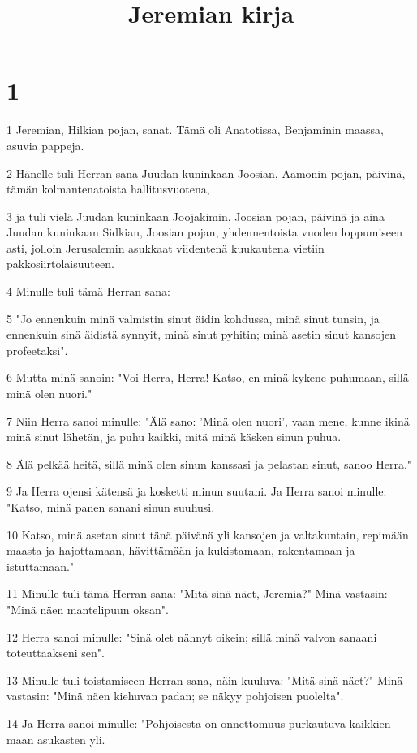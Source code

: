 

\title{Jeremian kirja}


\chapter{1}

\par 1 Jeremian, Hilkian pojan, sanat. Tämä oli Anatotissa, Benjaminin maassa, asuvia pappeja.
\par 2 Hänelle tuli Herran sana Juudan kuninkaan Joosian, Aamonin pojan, päivinä, tämän kolmantenatoista hallitusvuotena,
\par 3 ja tuli vielä Juudan kuninkaan Joojakimin, Joosian pojan, päivinä ja aina Juudan kuninkaan Sidkian, Joosian pojan, yhdennentoista vuoden loppumiseen asti, jolloin Jerusalemin asukkaat viidentenä kuukautena vietiin pakkosiirtolaisuuteen.
\par 4 Minulle tuli tämä Herran sana:
\par 5 "Jo ennenkuin minä valmistin sinut äidin kohdussa, minä sinut tunsin, ja ennenkuin sinä äidistä synnyit, minä sinut pyhitin; minä asetin sinut kansojen profeetaksi".
\par 6 Mutta minä sanoin: "Voi Herra, Herra! Katso, en minä kykene puhumaan, sillä minä olen nuori."
\par 7 Niin Herra sanoi minulle: "Älä sano: 'Minä olen nuori', vaan mene, kunne ikinä minä sinut lähetän, ja puhu kaikki, mitä minä käsken sinun puhua.
\par 8 Älä pelkää heitä, sillä minä olen sinun kanssasi ja pelastan sinut, sanoo Herra."
\par 9 Ja Herra ojensi kätensä ja kosketti minun suutani. Ja Herra sanoi minulle: "Katso, minä panen sanani sinun suuhusi.
\par 10 Katso, minä asetan sinut tänä päivänä yli kansojen ja valtakuntain, repimään maasta ja hajottamaan, hävittämään ja kukistamaan, rakentamaan ja istuttamaan."
\par 11 Minulle tuli tämä Herran sana: "Mitä sinä näet, Jeremia?" Minä vastasin: "Minä näen mantelipuun oksan".
\par 12 Herra sanoi minulle: "Sinä olet nähnyt oikein; sillä minä valvon sanaani toteuttaakseni sen".
\par 13 Minulle tuli toistamiseen Herran sana, näin kuuluva: "Mitä sinä näet?" Minä vastasin: "Minä näen kiehuvan padan; se näkyy pohjoisen puolelta".
\par 14 Ja Herra sanoi minulle: "Pohjoisesta on onnettomuus purkautuva kaikkien maan asukasten yli.
